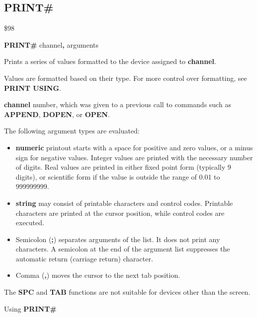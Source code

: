 
\newpage
\subsection{PRINT\#}
\begin{description}[leftmargin=2cm,style=nextline]
\item [Token:]    \$98

\item [Format:]   {\bf PRINT\#} channel{\bf,} arguments

\item [Usage:]    Prints a series of values formatted to the device assigned to {\bf channel}.

                  Values are formatted based on their type. For more control over formatting, see {\bf PRINT USING}.

                  {\bf channel} number, which was given to a previous call to commands such as {\bf APPEND}, {\bf DOPEN}, or {\bf OPEN}.

                  The following argument types are evaluated:
                  \begin{itemize}
                     \item {\bf numeric} printout starts with a space for positive and zero values, or a minus sign for negative values. Integer values are printed with the necessary number of digits. Real values are printed in either fixed point form (typically 9 digits), or scientific form if the value is outside the range of 0.01 to 999999999.
                     \item {\bf string} may consist of printable characters and control codes. Printable characters are printed at the cursor position, while control codes are executed.
                     \item Semicolon ({\bf ;}) separates arguments of the list. It does not print any characters. A semicolon at the end of the argument list suppresses the automatic return (carriage return) character.
                     \item Comma ({\bf ,}) moves the cursor to the next tab position.
                  \end{itemize}

\item [Remarks:]  The {\bf SPC} and {\bf TAB} functions are not suitable for devices other than the screen.

\item [Example:]  Using {\bf PRINT\#}


\end{description}
